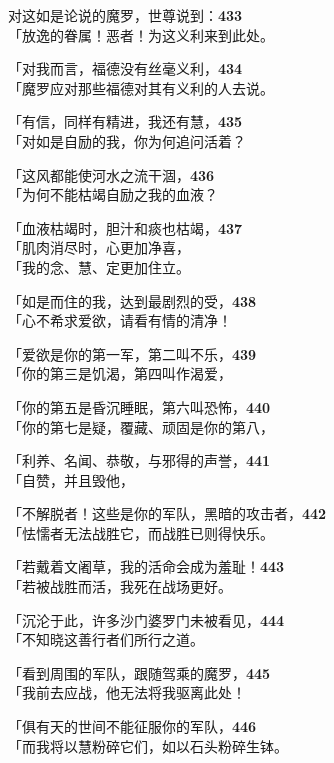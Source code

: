 对这如是论说的魔罗，世尊说到：\hfill{\grayfootnotesize \textbf{433}} \\
「放逸的眷属！恶者！为这义利来到此处。


「对我而言，福德没有丝毫义利，\hfill{\grayfootnotesize \textbf{434}} \\
「魔罗应对那些福德对其有义利的人去说。


「有信，同样有精进，我还有慧，\hfill{\grayfootnotesize \textbf{435}} \\
「对如是自励的我，你为何追问活着？


「这风都能使河水之流干涸，\hfill{\grayfootnotesize \textbf{436}} \\
「为何不能枯竭自励之我的血液？


「血液枯竭时，胆汁和痰也枯竭，\hfill{\grayfootnotesize \textbf{437}} \\
「肌肉消尽时，心更加净喜，\\
「我的念、慧、定更加住立。


「如是而住的我，达到最剧烈的受，\hfill{\grayfootnotesize \textbf{438}} \\
「心不希求爱欲，请看有情的清净！


「爱欲是你的第一军，第二叫不乐，\hfill{\grayfootnotesize \textbf{439}} \\
「你的第三是饥渴，第四叫作渴爱，


「你的第五是昏沉睡眠，第六叫恐怖，\hfill{\grayfootnotesize \textbf{440}} \\
「你的第七是疑，覆藏、顽固是你的第八，


「利养、名闻、恭敬，与邪得的声誉，\hfill{\grayfootnotesize \textbf{441}} \\
「自赞，并且毁他，


「不解脱者！这些是你的军队，黑暗的攻击者，\hfill{\grayfootnotesize \textbf{442}} \\
「怯懦者无法战胜它，而战胜已则得快乐。


「若戴着文阇草，我的活命会成为羞耻！\hfill{\grayfootnotesize \textbf{443}} \\
「若被战胜而活，我死在战场更好。


「沉沦于此，许多沙门婆罗门未被看见，\hfill{\grayfootnotesize \textbf{444}} \\
「不知晓这善行者们所行之道。


「看到周围的军队，跟随驾乘的魔罗，\hfill{\grayfootnotesize \textbf{445}} \\
「我前去应战，他无法将我驱离此处！


「俱有天的世间不能征服你的军队，\hfill{\grayfootnotesize \textbf{446}} \\
「而我将以慧粉碎它们，如以石头粉碎生钵。



